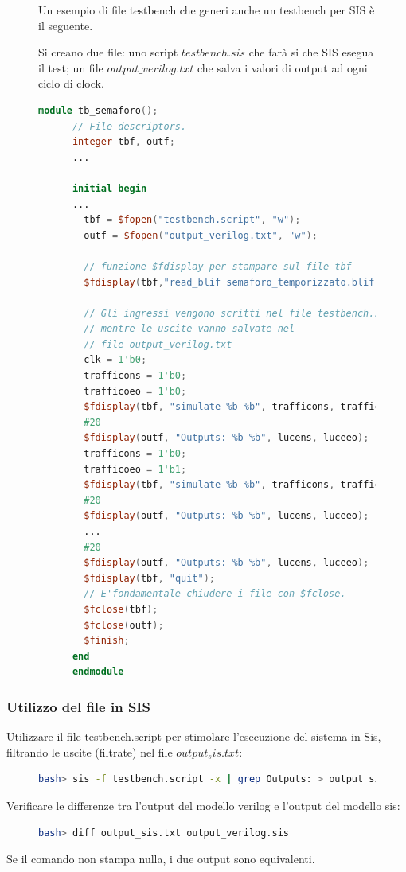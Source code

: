 \documentclass[a4paper]{article}
\theoremstyle{break}
\theoremstyle{break}
\theoremstyle{break}
\theoremstyle{break}
\begin{document}
\begin{figure}[H]
  \begin{example}
    Un esempio di file testbench che generi anche un testbench per SIS è il seguente.

    Si creano due file: uno script \( testbench.sis \) che farà si che SIS esegua
    il test; un file \( output\_verilog.txt \) che salva i valori di output ad ogni
    ciclo di clock.
    \begin{lstlisting}[language=Verilog]
      module tb_semaforo();
      // File descriptors.
      integer tbf, outf;
      ...

      initial begin
      ...
        tbf = $fopen("testbench.script", "w");
        outf = $fopen("output_verilog.txt", "w");

        // funzione $fdisplay per stampare sul file tbf
        $fdisplay(tbf,"read_blif semaforo_temporizzato.blif");

        // Gli ingressi vengono scritti nel file testbench.script,
        // mentre le uscite vanno salvate nel 
        // file output_verilog.txt
        clk = 1'b0;
        trafficons = 1'b0;
        trafficoeo = 1'b0;
        $fdisplay(tbf, "simulate %b %b", trafficons, trafficoeo);
        #20
        $fdisplay(outf, "Outputs: %b %b", lucens, luceeo);
        trafficons = 1'b0;
        trafficoeo = 1'b1;
        $fdisplay(tbf, "simulate %b %b", trafficons, trafficoeo);
        #20
        $fdisplay(outf, "Outputs: %b %b", lucens, luceeo);
        ...
        #20
        $fdisplay(outf, "Outputs: %b %b", lucens, luceeo);
        $fdisplay(tbf, "quit");
        // E'fondamentale chiudere i file con $fclose.
        $fclose(tbf);
        $fclose(outf);
        $finish;
      end
      endmodule
    \end{lstlisting}
  \end{example}
\end{figure}
\subsubsection{Utilizzo del file in SIS}
Utilizzare il file testbench.script per stimolare l’esecuzione del sistema
in Sis, filtrando le uscite (filtrate) nel file \( output_sis.txt \):
\begin{figure}[H]
  \begin{lstlisting}[language=bash]
    bash> sis -f testbench.script -x | grep Outputs: > output_sis.txt
  \end{lstlisting}
\end{figure}
Verificare le differenze tra l’output del modello verilog e l’output del
modello sis:
\begin{figure}[H]
  \begin{lstlisting}[language=bash]
    bash> diff output_sis.txt output_verilog.sis
  \end{lstlisting}
\end{figure}
Se il comando non stampa nulla, i due output sono equivalenti.
\end{document}
